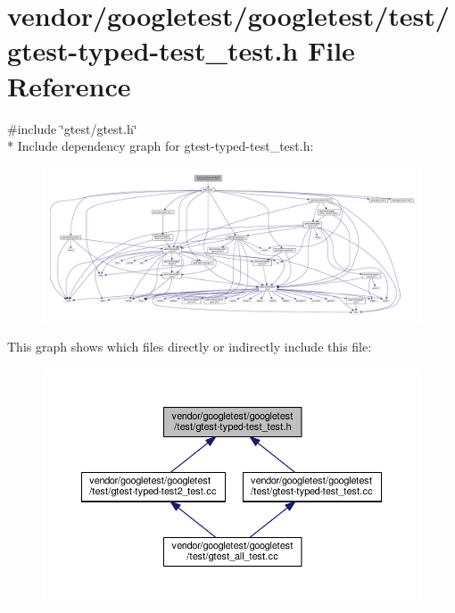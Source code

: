 \hypertarget{gtest-typed-test__test_8h}{}\section{vendor/googletest/googletest/test/gtest-\/typed-\/test\+\_\+test.h File Reference}
\label{gtest-typed-test__test_8h}
{\ttfamily \#include \char`\"{}gtest/gtest.\+h\char`\"{}}\\*
Include dependency graph for gtest-\/typed-\/test\+\_\+test.h\+:
\nopagebreak
\begin{figure}[H]
\begin{center}
\leavevmode
\includegraphics[width=350pt]{gtest-typed-test__test_8h__incl}
\end{center}
\end{figure}
This graph shows which files directly or indirectly include this file\+:
\nopagebreak
\begin{figure}[H]
\begin{center}
\leavevmode
\includegraphics[width=350pt]{gtest-typed-test__test_8h__dep__incl}
\end{center}
\end{figure}
